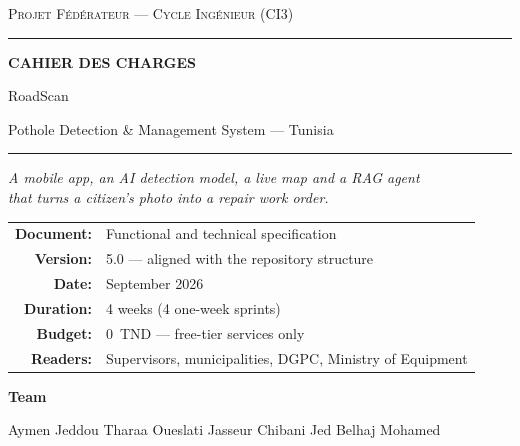 \documentclass[11pt,a4paper,oneside]{report}
\begin{document}
\raggedbottom

\begin{titlepage}
\centering
{\large\textsc{Projet F\'ed\'erateur --- Cycle Ing\'enieur (CI3)}\par}
\vspace{2.2cm}
{\color{accent}\rule{\linewidth}{1.2pt}\par}
\vspace{0.6cm}
{\Huge\bfseries\color{accent} CAHIER DES CHARGES\par}
\vspace{0.4cm}
{\LARGE RoadScan\par}
{\large Pothole Detection \& Management System --- Tunisia\par}
\vspace{0.4cm}
{\color{accent}\rule{\linewidth}{1.2pt}\par}
\vspace{1.2cm}
{\itshape A mobile app, an AI detection model, a live map and a RAG agent\\
that turns a citizen's photo into a repair work order.\par}
\vspace{2cm}
\begin{tabular}{@{}rl@{}}
\textbf{Document:} & Functional and technical specification\\
\textbf{Version:} & 5.0 --- aligned with the repository structure\\
\textbf{Date:} & September 2026\\
\textbf{Duration:} & 4 weeks (4 one-week sprints)\\
\textbf{Budget:} & 0~TND --- free-tier services only\\
\textbf{Readers:} & Supervisors, municipalities, DGPC, Ministry of Equipment
\end{tabular}
\vfill
{\large\textbf{Team}\par}
\vspace{0.2cm}
Aymen Jeddou \quad Tharaa Oueslati \quad Jasseur Chibani \quad Jed Belhaj Mohamed
\vspace{1cm}
\end{titlepage}

\end{document}
